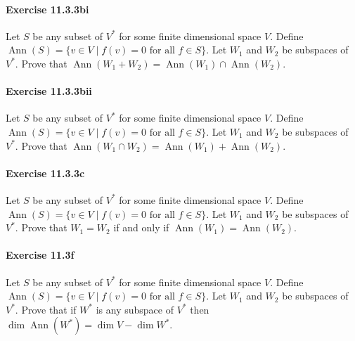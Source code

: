 \documentclass{article}
\theoremstyle{definition}
\begin{document}
\paragraph{Exercise 11.3.3bi} Let $S$ be any subset of $V^*$ for some finite dimensional space $V$. Define $\operatorname{Ann}(S)=\{v \in V \mid f(v)=0 \text{ for all } f \in S\}$. Let $W_1$ and $W_2$ be subspaces of $V^*$. Prove that $\operatorname{Ann}(W_1+W_2)=\operatorname{Ann}(W_1) \cap\operatorname{Ann}(W_2)$.

\paragraph{Exercise 11.3.3bii} Let $S$ be any subset of $V^*$ for some finite dimensional space $V$. Define $\operatorname{Ann}(S)=\{v \in V \mid f(v)=0 \text{ for all } f \in S\}$. Let $W_1$ and $W_2$ be subspaces of $V^*$. Prove that $\operatorname{Ann}(W_1\cap W_2)=\operatorname{Ann}(W_1) + \operatorname{Ann}(W_2)$.

\paragraph{Exercise 11.3.3c} Let $S$ be any subset of $V^*$ for some finite dimensional space $V$. Define $\operatorname{Ann}(S)=\{v \in V \mid f(v)=0 \text{ for all } f \in S\}$. Let $W_1$ and $W_2$ be subspaces of $V^*$. Prove that $W_1=W_2$ if and only if $\operatorname{Ann}(W_1)=\operatorname{Ann}(W_2)$.

\paragraph{Exercise 11.3f} Let $S$ be any subset of $V^*$ for some finite dimensional space $V$. Define $\operatorname{Ann}(S)=\{v \in V \mid f(v)=0 \text{ for all } f \in S\}$. Let $W_1$ and $W_2$ be subspaces of $V^*$. Prove that if $W^*$ is any subspace of $V^*$ then $\operatorname{dim} \operatorname{Ann}(W^*)=\operatorname{dim} V-\operatorname{dim} W^*$.
\end{document}
